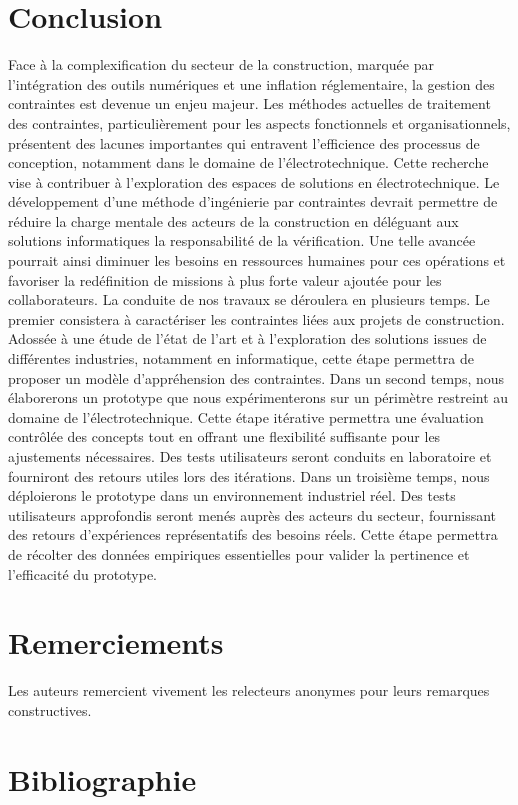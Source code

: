 \documentclass[a4paper,12pt]{article}
\begin{document}
\section{Conclusion}
\label{sec:orgbbd3605}
Face à la complexification du secteur de la construction, marquée par l'intégration des outils numériques et une inflation réglementaire, la gestion des contraintes est devenue un enjeu majeur. Les méthodes actuelles de traitement des contraintes, particulièrement pour les aspects fonctionnels et organisationnels, présentent des lacunes importantes qui entravent l'efficience des processus de conception, notamment dans le domaine de l'électrotechnique.
Cette recherche vise à contribuer à l’exploration des espaces de solutions en électrotechnique. Le développement d’une méthode d’ingénierie par contraintes devrait permettre de réduire la charge mentale des acteurs de la construction en déléguant aux solutions informatiques la responsabilité de la vérification. Une telle avancée pourrait ainsi diminuer les besoins en ressources humaines pour ces opérations et favoriser la redéfinition de missions à plus forte valeur ajoutée pour les collaborateurs.
La conduite de nos travaux se déroulera en plusieurs temps. Le premier consistera à caractériser les contraintes liées aux projets de construction. Adossée à une étude de l’état de l’art et à l’exploration des solutions issues de différentes industries, notamment en informatique, cette étape permettra de proposer un modèle d'appréhension des contraintes. Dans un second temps, nous élaborerons un prototype que nous expérimenterons sur un périmètre restreint au domaine de l’électrotechnique. Cette étape itérative permettra une évaluation contrôlée des concepts tout en offrant une flexibilité suffisante pour les ajustements nécessaires. Des tests utilisateurs seront conduits en laboratoire et fourniront des retours utiles lors des itérations. Dans un troisième temps, nous déploierons le prototype dans un environnement industriel réel. Des tests utilisateurs approfondis seront menés auprès des acteurs du secteur, fournissant des retours d'expériences représentatifs des besoins réels. Cette étape permettra de récolter des données empiriques essentielles pour valider la pertinence et l’efficacité du prototype.
\section{Remerciements}
\label{sec:orgf4350c7}
Les auteurs remercient vivement les relecteurs anonymes pour leurs remarques constructives.
\section{Bibliographie}
\label{sec:orgecf41f5}
\begin{multicols}{2}\small{
\printbibliography[heading=none]
}\clearpage\end{multicols}
\end{document}
